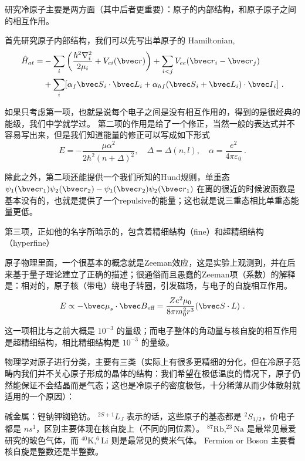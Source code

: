 
研究冷原子主要是两方面（其中后者更重要）：原子的内部结构，和原子原子之间的相互作用。

首先研究原子内部结构，我们可以先写出单原子的 Hamiltonian,
\begin{equation}
\begin{split}
\hat{H}_{at}=&-\sum_i\left(\frac{\hbar^2\nabla_i^2}{2\mu_i}+V_{ei}({\bvec r})\right) + \sum_{i<j}V_{ee}({\bvec r}_i-{\bvec r}_j)\\
&+\sum_i [\alpha_f {\bvec S}_i\cdot{\bvec L}_i+\alpha_{hf}({\bvec S}_i+{\bvec L}_i)\cdot {\bvec I}_i]~.
\end{split}
\end{equation}

如果只考虑第一项，也就是说每个电子之间是没有相互作用的，得到的是很经典的能级，我们中学就学过。 第二项的作用是给了一个修正，当然一般的表达式并不容易写出来，但是我们知道能量的修正可以写成如下形式
\begin{equation}
E = -\frac{\mu\alpha^2}{2\hbar^2(n+\Delta)^2},\quad \Delta = \Delta(n,l),\quad \alpha = \frac{e^2}{4\pi\varepsilon_0}~.
\end{equation}

除此之外，第二项还能提供一个我们所知的Hund规则，单重态 $\psi_1({\bvec r}_1)\psi_2({\bvec r}_2)-\psi_1({\bvec r}_2)\psi_2({\bvec r}_1)$ 在离的很近的时候波函数是基本没有的，也就是提供了一个repulsive的能量；这也就是说三重态相比单重态能量更低。

第三项，正如他的名字所暗示的，包含着精细结构（fine）和超精细结构（hyperfine）

原子物理里面，一个很基本的概念就是Zeeman效应，这是实验上观测到，并在后来基于量子理论建立了正确的描述；很通俗而且愚蠢的Zeeman项（系数）的解释是：相对的，原子核（带电）绕电子转圈，引发磁场，与电子的自旋相互作用。
\begin{equation}
E\propto -{\bvec\mu}_s\cdot{\bvec B}_{\text{eff}}=\frac{Ze^2\mu_0}{8\pi m_0^2 r^3}({\bvec S\cdot L})~.
\end{equation}

这一项相比与之前大概是 $10^{-3}$ 的量级；而电子整体的角动量与核自旋的相互作用是超精细结构，相比精细结构是 $10^{-3}$ 的量级。

物理学对原子进行分类，主要有三类（实际上有很多更精细的分化，但在冷原子范畴内我们并不关心原子形成的晶体的结构：我们希望在极低温度的情况下，原子仍然能保证不会结晶而是气态；这也是冷原子的密度极低，十分稀薄从而少体散射就适用的一个原因）：

碱金属：锂钠钾铷铯钫。 $^{2S+1}L_J$ 表示的话，这些原子的基态都是 $^2 S_{1/2}$，价电子都是 $ns^1$，区别主要体现在核自旋上（不同的同位素）。 $^{87}\text{Rb}, ^{23}\text{Na}$ 是最常见最爱研究的玻色气体，而 $^{40}\text{K}, ^6 \text{Li}$ 则是最常见的费米气体。 Fermion or Boson 主要看核自旋是整数还是半整数。

